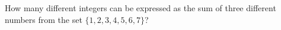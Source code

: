 How many different integers can be expressed as the sum of three different numbers from the set $\{1,2,3,4,5,6,7\}$?
